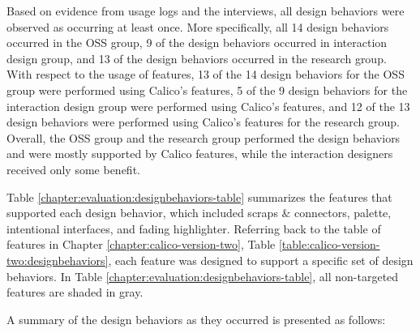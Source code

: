 Based on evidence from usage logs and the interviews, all design behaviors were observed as occurring at least once. More specifically, all 14 design behaviors occurred in the OSS group, 9 of the design behaviors occurred in interaction design group, and 13 of the design behaviors occurred in the research group. With respect to the usage of features, 13 of the 14 design behaviors for the OSS group were performed using Calico's features, 5 of the 9 design behaviors for the interaction design group were performed using Calico's features, and 12 of the 13 design behaviors were performed using Calico's features for the research group. Overall, the OSS group and the research group performed the design behaviors and were mostly supported by Calico features, while the interaction designers received only some benefit. 

Table \ref{chapter:evaluation:designbehaviors-table} summarizes the features that supported each design behavior, which included scraps \& connectors, palette, intentional interfaces, and fading highlighter. Referring back to the table of features in Chapter \ref{chapter:calico-version-two}, Table \ref{table:calico-version-two:designbehaviors}, each feature was designed to support a specific set of design behaviors. In Table \ref{chapter:evaluation:designbehaviors-table}, all non-targeted features are shaded in gray.

A summary of the design behaviors as they occurred is presented as follows:

